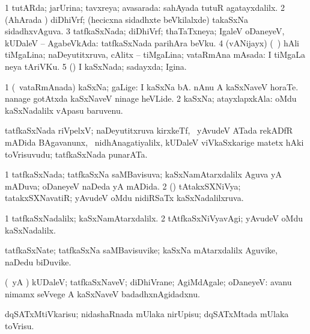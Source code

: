 \bentry
{}
\gl{\gu}
\bmng
\bnum
\num{1} tutARda; jarUrina; tavxreya; avasarada:  sahAyada tutuR agatayxdalilx. 
\num{2} (AhArada \vi) diDhiVrf; (hecicxna sidadhxte beVkilalxde) takaSxNa sidadhxvAguva. 
\num{3} tatfkaSxNada; diDhiVrf; thaTaTxneya; IgaleV oDaneyeV, kUDaleV -- AgabeVkAda:  tatfkaSxNada parihAra beVku. 
\num{4} (vANijayx) (\saMkiSx\ ) hAli tiMgaLina; naDeyutitxruva, cAlitx -- tiMgaLina; vataRmAna mAsada:  I tiMgaLa neya tAriVKu. 
\num{5} (\pArxparx) I kaSxNada; sadayxda; Igina. 
\enum
\emng
\eentry

\bentry
{}
\gl{\nA}
\bmng
\bnum
\num{1} (\kanmu\ vataRmAnada) kaSxNa; gaLige:  I kaSxNa bA.  nAnu A kaSxNaveV horaTe.  nanage gotAtxda kaSxNaveV ninage heVLide. 
\num{2} kaSxNa; atayxlapxkAla:  oMdu kaSxNadalilx vApasu baruvenu. 
\enum
\emng

\noindent
\gl{\pagu}
\bmng
{} tatfkaSxNada riVpelxV; naDeyutitxruva kirxkeTf, \mo\ yAvudeV ATada rekADfR mADida BAgavanunx, \kanmu\ nidhAnagatiyalilx, kUDaleV viVkaSxkarige matetx hAki toVrisuvudu; tatfkaSxNada punarATa. 
\emng
\eentry

\bentry
{}
\gl{\gu}
\bmng
\bnum
\num{1} tatfkaSxNada; tatfkaSxNa saMBavisuva; kaSxNamAtarxdalilx Aguva yA mADuva; oDaneyeV naDeda yA mADida. 
\num{2} (\Bwvi) tAtakxSXNiVya; tatakxSXNavatiR; yAvudeV oMdu nidiRSaTx kaSxNadalilxruva. 
\enum
\emng
\eentry

\bentry
{}
\gl{\kirxvi}
\bmng
\bnum
\num{1} tatfkaSxNadalilx; kaSxNamAtarxdalilx. 
\num{2} tAtfkaSxNiVyavAgi; yAvudeV oMdu kaSxNadalilx. 
\enum
\emng
\eentry

\bentry
{}
\gl{\nA}
\bmng
tatfkaSxNate; tatfkaSxNa saMBavisuvike; kaSxNa mAtarxdalilx Aguvike, naDedu biDuvike. 
\emng
\eentry

\bentry
{}
\gl{\kirxvi}
\bmng
(\pArxparx\ yA \hA) kUDaleV; tatfkaSxNaveV; diDhiVrane; AgiMdAgale; oDaneyeV:  avanu nimamx seVvege A kaSxNaveV badadhxnAgidadxnu. 
\emng
\eentry

\bentry
{}
\gl{\sakirx}
\bmng
dqSATxMtiVkarisu; nidashaRnada mUlaka nirUpisu; dqSATxMtada mUlaka toVrisu. 
\emng
\eentry

